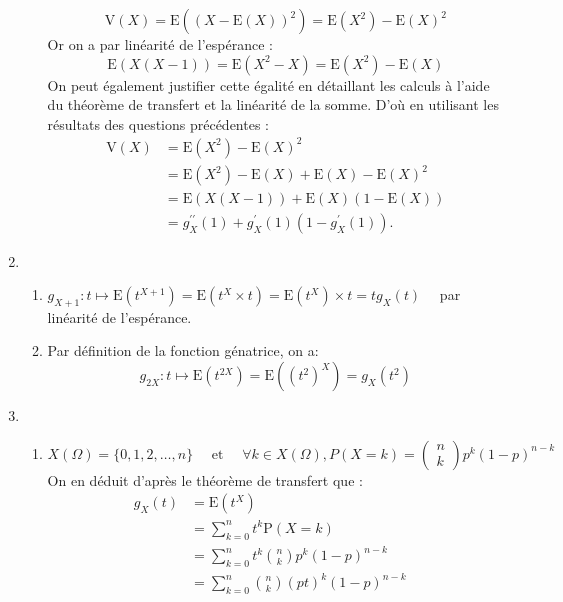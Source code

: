 \documentclass[a4paper, 11pt,reqno]{article}
\begin{document}
\begin{correction}
\begin{enumerate}
\begin{enumerate}
$$
\mathrm{V}(X)=\mathrm{E}\left((X-\mathrm{E}(X))^{2}\right)=\mathrm{E}\left(X^{2}\right)-\mathrm{E}(X)^{2}
$$
Or on a par linéarité de l'espérance :
$$
\mathrm{E}(X(X-1))=\mathrm{E}\left(X^{2}-X\right)=\mathrm{E}\left(X^{2}\right)-\mathrm{E}(X)
$$
 On peut également justifier cette égalité en détaillant les calculs à l'aide du  théorème de transfert et la linéarité de la somme.  D'où en utilisant les résultats des questions précédentes :
 \begin{align*}
\mathrm{V}(X) &=\mathrm{E}\left(X^{2}\right)-\mathrm{E}(X)^{2}\\
					&=\mathrm{E}\left(X^{2}\right)-\mathrm{E}(X)+\mathrm{E}(X)-\mathrm{E}(X)^{2}\\
					&=\mathrm{E}(X(X-1))+\mathrm{E}(X)(1-\mathrm{E}(X)) \\
					&= g_{X}^{\prime \prime}(1)+g_{X}^{\prime}(1)\left(1-g_{X}^{\prime}(1)\right) .
\end{align*}  


\end{enumerate}
\item
\begin{enumerate}
\item $g_{X+1}: t \mapsto \mathrm{E}\left(t^{X+1}\right)=\mathrm{E}\left(t^{X} \times t\right)=\mathrm{E}\left(t^{X}\right) \times t=t g_{X}(t) \quad$ par linéarité de l'espérance.


\item Par définition de la fonction génatrice, on a:
$$
g_{2 X}: t \mapsto \mathrm{E}\left(t^{2 X}\right)=\mathrm{E}\left(\left(t^{2}\right)^{X}\right)=g_{X}\left(t^{2}\right)
$$
\end{enumerate}
\item \begin{enumerate}
\item $$
X(\Omega)=\{0,1,2, \ldots, n\} \quad \text { et } \quad \forall k \in X(\Omega), P(X=k)=\left(\begin{array}{l}
n \\
k
\end{array}\right) p^{k}(1-p)^{n-k}
$$
On en déduit d'après le théorème de transfert que :
\begin{align*}
g_{X}( t)&=\mathrm{E}\left(t^{X}\right)&\\
	&=\sum_{k=0}^{n} t^{k} \mathrm{P}(X=k)\\
	&=\sum_{k=0}^{n} t^{k}\binom{n}{k}p^{k}(1-p)^{n-k}\\
&=\sum_{k=0}^{n}\binom{n}{k}(p t)^{k}(1-p)^{n-k}
\end{align*}


\end{enumerate}
\end{enumerate}
\end{correction}
\end{document}
